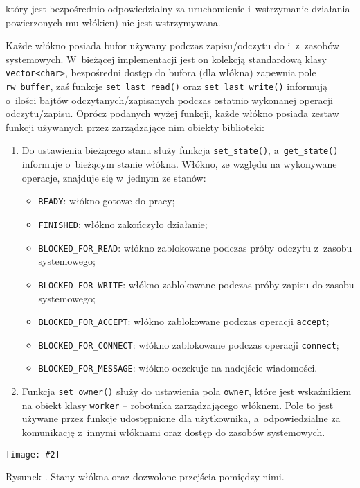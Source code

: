 \documentclass[12pt]{mwart}
\newcommand{\code}{\texttt}
\newcommand{\procbr}{()}
\newcommand{\function}[1]{\code{#1\procbr}}
\newcounter{figmain}
\newcommand{\myownfigure}[4]{ \newcounter{#1} \setcounter{#1}{\value{figmain}} \addtocounter{figmain}{1} \begin{center} \label{fig:#1} \centering \texttt{[image: \#2]}\\ \nopagebreak[5] \parbox[t]{11.5cm}{Rysunek \arabic{#1}. #3.} \end{center}}
\begin{document}
  który jest bezpośrednio odpowiedzialny za uruchomienie i~wstrzymanie działania powierzonych mu włókien) nie jest wstrzymywana.
\par
\indent
  Każde włókno posiada bufor używany podczas zapisu/odczytu do i~z~zasobów systemowych. 
  W~bieżącej implementacji jest on kolekcją standardową klasy \code{vector<char>},
  bezpośredni dostęp do bufora (dla włókna) zapewnia pole \code{rw\_buffer}, zaś funkcje \function{set\_last\_read} oraz \function{set\_last\_write} 
  informują o~ilości bajtów odczytanych/zapisanych podczas ostatnio wykonanej operacji odczytu/zapisu.
  Oprócz podanych wyżej funkcji, każde włókno posiada zestaw funkcji używanych przez zarządzające nim obiekty biblioteki:
  \begin{enumerate}
    \item Do ustawienia bieżącego stanu służy funkcja \function{set\_state}, a~\function{get\_state} informuje o~bieżącym stanie włókna.
    Włókno, ze względu na wykonywane operacje, znajduje się w~jednym ze stanów:
    \begin{itemize}
      \item \code{READY}: włókno gotowe do pracy;
      \item \code{FINISHED}: włókno zakończyło działanie;
      \item \code{BLOCKED\_FOR\_READ}: włókno zablokowane podczas próby odczytu z~zasobu systemowego;
      \item \code{BLOCKED\_FOR\_WRITE}:  włókno zablokowane podczas próby zapisu do zasobu systemowego;
      \item \code{BLOCKED\_FOR\_ACCEPT}:  włókno zablokowane podczas operacji \code{accept};
      \item \code{BLOCKED\_FOR\_CONNECT}:  włókno zablokowane podczas operacji \code{connect};
      \item \code{BLOCKED\_FOR\_MESSAGE}:  włókno oczekuje na nadejście wiadomości.
    \end{itemize}
    \item Funkcja \function{set\_owner} służy do ustawienia pola \code{owner}, które jest wskaźnikiem na obiekt klasy \code{worker} -- robotnika 
    zarządzającego włóknem. Pole to jest używane przez funkcje udostępnione dla użytkownika, a~odpowiedzialne za komunikację z~innymi włóknami oraz dostęp 
    do zasobów systemowych.
  \end{enumerate}
\par
\indent
  \myownfigure{LibcoroStates}{LibcoroStates.png}{Stany włókna oraz dozwolone przejścia pomiędzy nimi}{.55}
\par
\newpage
\end{document}
